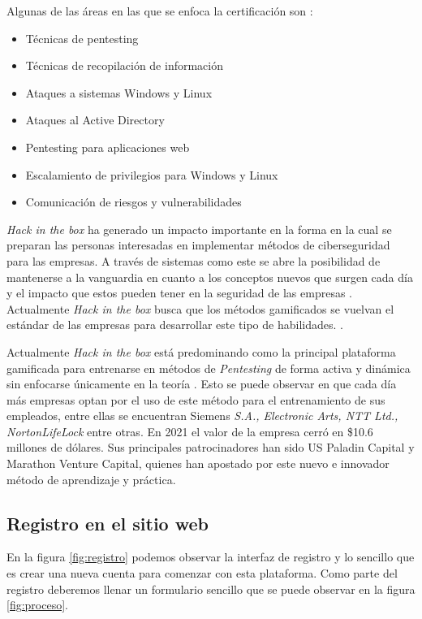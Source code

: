 \documentclass{article}
\begin{document}
        Algunas de las áreas en las que se enfoca la certificación son \cite{htb-cert-info}:
        \begin{itemize}
            \item Técnicas de pentesting
            \item Técnicas de recopilación de información
            \item Ataques a sistemas Windows y Linux
            \item Ataques al Active Directory
            \item Pentesting para aplicaciones web
            \item Escalamiento de privilegios para Windows y Linux
            \item Comunicación de riesgos y vulnerabilidades
        \end{itemize}

        \textit{Hack in the box} ha generado un impacto importante en la forma en la cual se preparan las personas interesadas en implementar métodos de ciberseguridad para las empresas. A través de sistemas como este se abre la posibilidad de mantenerse a la vanguardia en cuanto a los conceptos nuevos que surgen cada día y el impacto que estos pueden tener en la seguridad de las empresas \cite{redef}. Actualmente \textit{Hack in the box} busca que los métodos gamificados se vuelvan el estándar de las empresas para desarrollar este tipo de habilidades.  \cite{raises}. 
        
        Actualmente \textit{Hack in the box} está predominando como la principal plataforma gamificada para entrenarse en métodos de \textit{Pentesting} de forma activa y dinámica sin enfocarse únicamente en la teoría \cite{redef}. Esto se puede observar en que cada día más empresas optan por el uso de este método para el entrenamiento de sus empleados, entre ellas se encuentran Siemens \textit{S.A., Electronic Arts, NTT Ltd., NortonLifeLock} entre otras. En 2021 el valor de la empresa cerró en \$10.6 millones de dólares. Sus principales patrocinadores han sido US Paladin Capital y Marathon Venture Capital, quienes han apostado por este nuevo e innovador método de aprendizaje y práctica\cite{raises}.

        \subsection{Registro en el sitio web}

            En la figura \ref{fig:registro} podemos observar la interfaz de registro y lo sencillo que es crear una nueva cuenta para comenzar con esta plataforma. Como parte del registro deberemos llenar un formulario sencillo que se puede observar en la figura \ref{fig:proceso}.
            
\end{document}
